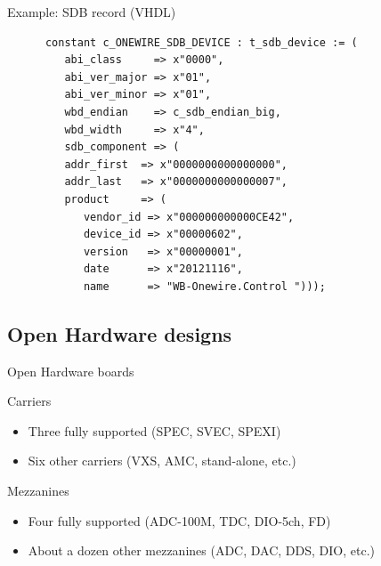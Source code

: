 \documentclass[compress,red]{beamer}
\begin{document}
\begin{frame}[fragile]{Example: SDB record (VHDL)}

    \begin{verbatim}
      constant c_ONEWIRE_SDB_DEVICE : t_sdb_device := (
         abi_class     => x"0000",
         abi_ver_major => x"01",
         abi_ver_minor => x"01",
         wbd_endian    => c_sdb_endian_big,
         wbd_width     => x"4",
         sdb_component => (
         addr_first  => x"0000000000000000",
         addr_last   => x"0000000000000007",
         product     => (
            vendor_id => x"000000000000CE42",
            device_id => x"00000602",
            version   => x"00000001",
            date      => x"20121116",
            name      => "WB-Onewire.Control ")));
    \end{verbatim}

\end{frame}


\subsection{Open Hardware designs}

\begin{frame}{Open Hardware boards}

  \begin{block}{Carriers}
    \begin{itemize}
    \item Three fully supported (SPEC, SVEC, SPEXI)
    \item Six other carriers (VXS, AMC, stand-alone, etc.)
    \end{itemize}
  \end{block}


  \begin{block}{Mezzanines}
    \begin{itemize}
    \item Four fully supported (ADC-100M, TDC, DIO-5ch, FD)
    \item About a dozen other mezzanines (ADC, DAC, DDS, DIO, etc.)
    \end{itemize}
  \end{block}


\end{frame}
\end{document}
